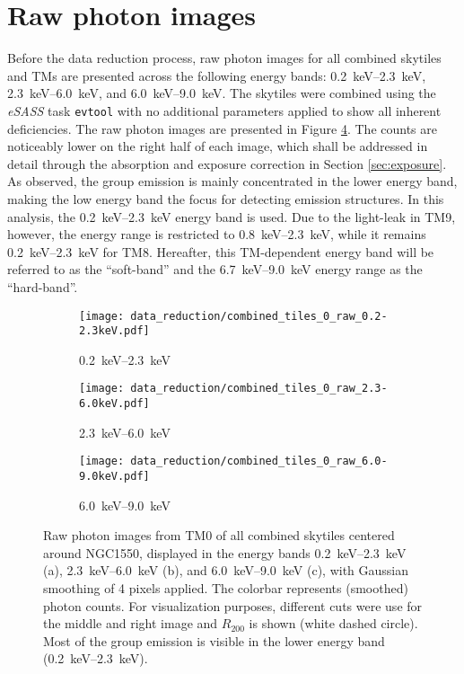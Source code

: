 \section{Raw photon images}\label{sec:raw_photon}
Before the data reduction process, raw photon images for all combined skytiles and TMs are presented across the following energy bands: \SIrange{0.2}{2.3}{\kilo\electronvolt}, \SIrange{2.3}{6.0}{\kilo\electronvolt}, and \SIrange{6.0}{9.0}{\kilo\electronvolt}. The skytiles were combined using the \textit{eSASS} task \texttt{evtool} with no additional parameters applied to show all inherent deficiencies. The raw photon images are presented in Figure \ref{fig:raw_photon_images}. The counts are noticeably lower on the right half of each image, which shall be addressed in detail through the absorption and exposure correction in Section \ref{sec:exposure}. As observed, the group emission is mainly concentrated in the lower energy band, making the low energy band the focus for detecting emission structures. In this analysis, the \SIrange{0.2}{2.3}{\kilo\electronvolt} energy band is used. Due to the light-leak in TM9, however, the energy range is restricted to \SIrange{0.8}{2.3}{\kilo\electronvolt}, while it remains \SIrange{0.2}{2.3}{\kilo\electronvolt} for TM8. Hereafter, this TM-dependent energy band will be referred to as the \enquote{soft-band} and the \SIrange{6.7}{9.0}{\kilo\electronvolt} energy range as the \enquote{hard-band}. 
\begin{figure}[htbp]
    \centering
    \begin{subfigure}{0.325\textwidth}
        \centering
        \texttt{[image: data\_reduction/combined\_tiles\_0\_raw\_0.2-2.3keV.pdf]}
        \caption{\SIrange{0.2}{2.3}{\kilo\electronvolt}}
        \label{fig:low_energy}
    \end{subfigure}
    \hfill
    \begin{subfigure}{0.325\textwidth}
        \centering
        \texttt{[image: data\_reduction/combined\_tiles\_0\_raw\_2.3-6.0keV.pdf]}
        \caption{\SIrange{2.3}{6.0}{\kilo\electronvolt}}
        \label{fig:mid_energy}
    \end{subfigure}
    \hfill
    \begin{subfigure}{0.325\textwidth}
        \centering
        \texttt{[image: data\_reduction/combined\_tiles\_0\_raw\_6.0-9.0keV.pdf]}
        \caption{\SIrange{6.0}{9.0}{\kilo\electronvolt}}
        \label{fig:high_energy}
    \end{subfigure}
    \caption{Raw photon images from TM0 of all combined skytiles centered around NGC1550, displayed in the energy bands \SIrange{0.2}{2.3}{\kilo\electronvolt} (a), \SIrange{2.3}{6.0}{\kilo\electronvolt} (b), and \SIrange{6.0}{9.0}{\kilo\electronvolt} (c), with Gaussian smoothing of 4 pixels applied. The colorbar represents (smoothed) photon counts. For visualization purposes, different cuts were use for the middle and right image and \(R_{200}\) is shown (white dashed circle). Most of the group emission is visible in the lower energy band (\SIrange{0.2}{2.3}{\kilo\electronvolt}).}
    \label{fig:raw_photon_images}
\end{figure}
%
